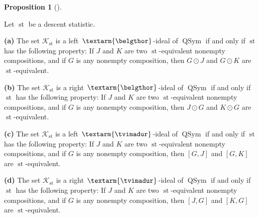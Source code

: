 \documentclass[numbers=enddot,12pt,final,onecolumn,notitlepage]{scrartcl}%
\theoremstyle{definition}
\newtheorem{prop}[theo]{Proposition}
\newenvironment{proposition}[1][]
{\begin{prop}[#1]\begin{leftbar}}
{\end{leftbar}\end{prop}}
\newcommand{\tvi}{\left. \textarm{\tvimadur} \right.}
\newcommand{\bel}{\left. \textarm{\belgthor} \right.}
\begin{document}
\begin{proposition}
\label{prop.bel-tvi-comp}Let $\operatorname*{st}$ be a descent statistic.

\textbf{(a)} The set $\mathcal{K}_{\operatorname*{st}}$ is a left $\bel$-ideal
of $\operatorname*{QSym}$ if and only if $\operatorname*{st}$ has the
following property: If $J$ and $K$ are two $\operatorname*{st}$-equivalent
nonempty compositions, and if $G$ is any nonempty composition, then $G\odot J$
and $G\odot K$ are $\operatorname*{st}$-equivalent.

\textbf{(b)} The set $\mathcal{K}_{\operatorname*{st}}$ is a right
$\bel$-ideal of $\operatorname*{QSym}$ if and only if $\operatorname*{st}$ has
the following property: If $J$ and $K$ are two $\operatorname*{st}$-equivalent
nonempty compositions, and if $G$ is any nonempty composition, then $J\odot G$
and $K\odot G$ are $\operatorname*{st}$-equivalent.

\textbf{(c)} The set $\mathcal{K}_{\operatorname*{st}}$ is a left $\tvi$-ideal
of $\operatorname*{QSym}$ if and only if $\operatorname*{st}$ has the
following property: If $J$ and $K$ are two $\operatorname*{st}$-equivalent
nonempty compositions, and if $G$ is any nonempty composition, then $\left[
G,J\right]  $ and $\left[  G,K\right]  $ are $\operatorname*{st}$-equivalent.

\textbf{(d)} The set $\mathcal{K}_{\operatorname*{st}}$ is a right
$\tvi$-ideal of $\operatorname*{QSym}$ if and only if $\operatorname*{st}$ has
the following property: If $J$ and $K$ are two $\operatorname*{st}$-equivalent
nonempty compositions, and if $G$ is any nonempty composition, then $\left[
J,G\right]  $ and $\left[  K,G\right]  $ are $\operatorname*{st}$-equivalent.
\end{proposition}
\end{document}

